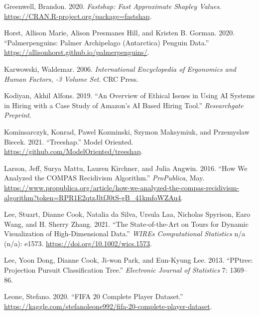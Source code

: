 \documentclass[
]{article}
\newlength{\cslhangindent}
\newlength{\cslentryspacingunit} %
\newenvironment{CSLReferences}[2] %
 {%
  \setlength{\parindent}{0pt}
  \ifodd #1
  \let\oldpar\par
  \def\par{\hangindent=\cslhangindent\oldpar}
  \fi
  \setlength{\parskip}{#2\cslentryspacingunit}
 }%
 {}
\begin{document}
\begin{CSLReferences}{1}{0}
\leavevmode{}%
Greenwell, Brandon. 2020. \emph{Fastshap: {Fast} {Approximate} {Shapley}
{Values}}. \url{https://CRAN.R-project.org/package=fastshap}.

\leavevmode{}%
Horst, Allison Marie, Alison Presmanes Hill, and Kristen B. Gorman.
2020. {``Palmerpenguins: {Palmer} {Archipelago} ({Antarctica}) Penguin
Data.''} \url{https://allisonhorst.github.io/palmerpenguins/}.

\leavevmode{}%
Karwowski, Waldemar. 2006. \emph{International {Encyclopedia} of
{Ergonomics} and {Human} {Factors}, -3 {Volume} {Set}}. CRC Press.

\leavevmode{}%
Kodiyan, Akhil Alfons. 2019. {``An Overview of Ethical Issues in Using
{AI} Systems in Hiring with a Case Study of {Amazon}'s {AI} Based Hiring
Tool.''} \emph{Researchgate Preprint}.

\leavevmode{}%
Kominsarczyk, Konrad, Pawel Kozminski, Szymon Maksymiuk, and Przemyslaw
Biecek. 2021. {``Treeshap.''} Model Oriented.
\url{https://github.com/ModelOriented/treeshap}.

\leavevmode{}%
Larson, Jeff, Surya Mattu, Lauren Kirchner, and Julia Angwin. 2016.
{``How {We} {Analyzed} the {COMPAS} {Recidivism} {Algorithm}.''}
\emph{ProPublica}, May.
\url{https://www.propublica.org/article/how-we-analyzed-the-compas-recidivism-algorithm?token=RPR1E2qtzJltfJ0tS-gB_41kmfoWZAu4}.

\leavevmode{}%
Lee, Stuart, Dianne Cook, Natalia da Silva, Ursula Laa, Nicholas
Spyrison, Earo Wang, and H. Sherry Zhang. 2021. {``The State-of-the-Art
on Tours for Dynamic Visualization of High-Dimensional Data.''}
\emph{WIREs Computational Statistics} n/a (n/a): e1573.
\url{https://doi.org/10.1002/wics.1573}.

\leavevmode{}%
Lee, Yoon Dong, Dianne Cook, Ji-won Park, and Eun-Kyung Lee. 2013.
{``{PPtree}: {Projection} Pursuit Classification Tree.''}
\emph{Electronic Journal of Statistics} 7: 1369--86.

\leavevmode{}%
Leone, Stefano. 2020. {``{FIFA} 20 Complete Player Dataset.''}
\url{https://kaggle.com/stefanoleone992/fifa-20-complete-player-dataset}.


\end{CSLReferences}
\end{document}
